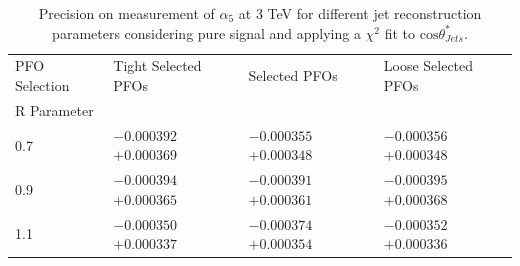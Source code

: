 \begin{table}[h!]
\centering
\begin{tabular}{l l l l}
\hline
PFO Selection & Tight Selected PFOs & Selected PFOs & Loose Selected PFOs \\ 
R Parameter & & & \\ 
\hline
0.7 & $-0.000392$ $+0.000369$ & $-0.000355$ $+0.000348$ & $-0.000356$ $+0.000348$ \\
0.9 & $-0.000394$ $+0.000365$ & $-0.000391$ $+0.000361$ & $-0.000395$ $+0.000368$ \\
1.1 & $-0.000350$ $+0.000337$ & $-0.000374$ $+0.000354$ & $-0.000352$ $+0.000336$ \\
\hline
\end{tabular}
\caption[$1\sigma$ precision on measurement of $\alpha_{5}$ for different jet reconstruction parameters considering pure signal at 3 TeV.]{Precision on measurement of $\alpha_{5}$ at 3 TeV for different jet reconstruction parameters considering pure signal and applying a $\chi^{2}$ fit to $\text{cos}\theta^{*}_{Jets}$.}
\label{table:precisiona5signaljetalgo3000GeV}
\end{table}

